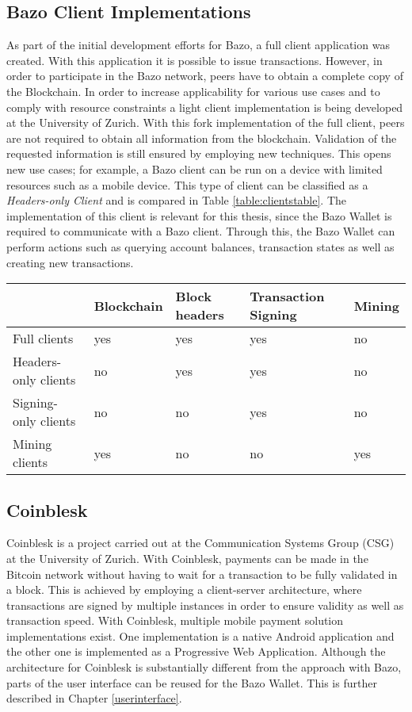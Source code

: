 \subsection{Bazo Client Implementations}
As part of the initial development efforts for Bazo, a full client application was created. With this application it is possible to issue transactions. However, in order to participate in the Bazo network, peers have to obtain a complete copy of the Blockchain. In order to increase applicability for various use cases and to comply with resource constraints a light client implementation is being developed at the University of Zurich. With this fork implementation of the full client, peers are not required to obtain all information from the blockchain. Validation of the requested information is still ensured by employing new techniques. This opens new use cases; for example, a Bazo client can be run on a device with limited resources such as a mobile device. This type of client can be classified as a \textit{Headers-only Client} \cite{bitcoinclients} and is compared in Table \ref{table:clientstable}.
The implementation of this client is relevant for this thesis, since the Bazo Wallet is required to communicate with a Bazo client. Through this, the Bazo Wallet can perform actions such as querying account balances, transaction states as well as creating new transactions.

\begin{center}
    \begin{tabular}{ | l | l | l | l | p{3cm} |}
    \hline
      & Blockchain & Block headers & Transaction Signing & Mining \\ \hline
    Full clients  & yes & yes & yes & no \\ \hline
    Headers-only clients  & no & yes & yes & no \\ \hline
    Signing-only clients  & no & no & yes & no \\ \hline
    Mining clients  & yes & no & no & yes \\ \hline
    \end{tabular}
    \label{table:clientstable}

\end{center}
\subsection{Coinblesk}
Coinblesk is a project carried out at the Communication Systems Group (CSG) at the University of Zurich. With Coinblesk, payments can be made in the Bitcoin network without having to wait for a transaction to be fully validated in a block. This is achieved by employing a client-server architecture, where transactions are signed by multiple instances in order to ensure validity as well as transaction speed.
With Coinblesk, multiple mobile payment solution implementations exist. One implementation is a native Android application and the other one is implemented as a Progressive Web Application. Although the architecture for Coinblesk is substantially different from the approach with Bazo, parts of the user interface can be reused for the Bazo Wallet. This is further described in Chapter \ref{userinterface}.
